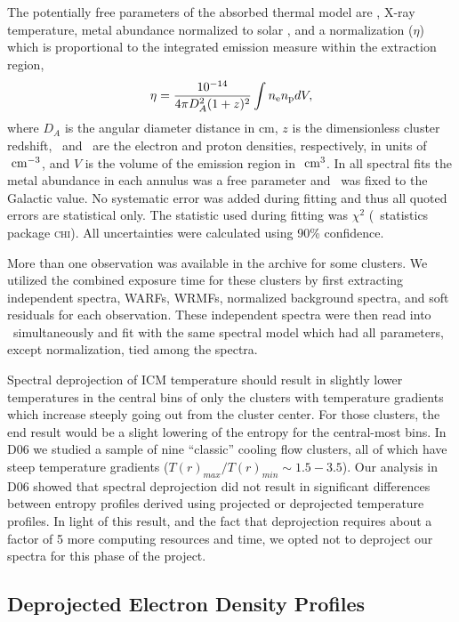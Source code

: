 \documentclass[12pt,preprint]{aastex}
\begin{document}
The potentially free parameters of the absorbed thermal model are
\nhi, X-ray temperature, metal abundance normalized to solar
\citep[heavy-element ratios taken from][]{ag89}, and a normalization
($\eta$) which is proportional to the integrated emission measure
within the extraction region,
\begin{equation}
\label{eqn:norm}
\eta = \frac{10^{-14}}{4\pi D_A^2(1+z)^2}\int n_{\mathrm{e}} n_{\mathrm{p}} dV,
\end{equation}
where $D_A$ is the angular diameter distance in cm, $z$ is the
dimensionless cluster redshift, \nelec\ and \np\ are the electron and
proton densities, respectively, in units of $\mbox{\ensuremath{\mathrm{~cm}}}^{-3}$, and $V$ is the
volume of the emission region in $\mbox{\ensuremath{\mathrm{~cm}}}^3$. In all spectral fits the
metal abundance in each annulus was a free parameter and \nhi\ was
fixed to the Galactic value. No systematic error was added during
fitting and thus all quoted errors are statistical only. The statistic
used during fitting was $\chi^2$ (\xspec\ statistics package
\textsc{chi}). All uncertainties were calculated using 90\%
confidence.

More than one observation was available in the archive for some
clusters. We utilized the combined exposure time for these clusters by
first extracting independent spectra, WARFs, WRMFs, normalized
background spectra, and soft residuals for each observation. These
independent spectra were then read into \xspec\ simultaneously and fit
with the same spectral model which had all parameters, except
normalization, tied among the spectra.

Spectral deprojection of ICM temperature should result in slightly
lower temperatures in the central bins of only the clusters with
temperature gradients which increase steeply going out from the
cluster center. For those clusters, the end result would be a slight
lowering of the entropy for the central-most bins. In D06 we studied a
sample of nine ``classic'' cooling flow clusters, all of which have
steep temperature gradients ($T(r)_{max}/T(r)_{min} \sim
1.5-3.5$). Our analysis in D06 showed that spectral deprojection did
not result in significant differences between entropy profiles derived
using projected or deprojected temperature profiles. In light of this
result, and the fact that deprojection requires about a factor of 5
more computing resources and time, we opted not to deproject our
spectra for this phase of the project.

\subsection{Deprojected Electron Density Profiles}
\label{sec:dene}
\end{document}
